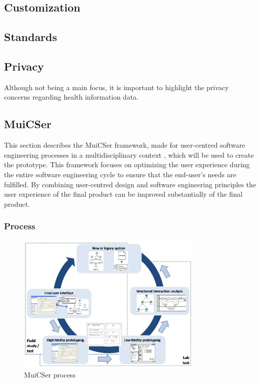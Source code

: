     \subsection{Customization}

    \subsection{Standards} \label{2_standards}

    \subsection{Privacy}
    Although not being a main focus, it is important to highlight the privacy concerns regarding health information data.

    \subsection{MuiCSer} \label{2_muicser}
    This section describes the MuiCSer framework, made for user-centred software engineering processes in a multidisciplinary context \cite{muicser}, which will be used to create the prototype. This framework focuses on optimizing the user experience during the entire software engineering cycle to ensure that the end-user's needs are fulfilled. By combining user-centred design and software engineering principles the user experience of the final product can be improved substantially of the final product.

        \subsubsection{Process}
        
        \begin{figure}[!t]
            \centering
            \includegraphics[width=0.8\textwidth]{chapters/2_background/muicser}
            \caption{MuiCSer process}\label{fig:muicser}
        \end{figure}

